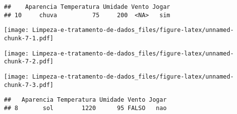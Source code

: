 \documentclass[
]{article}
\newenvironment{Shaded}{\begin{snugshade}}{\end{snugshade}}
\newcommand{\AttributeTok}[1]{\textcolor[rgb]{0.77,0.63,0.00}{#1}}
\newcommand{\CommentTok}[1]{\textcolor[rgb]{0.56,0.35,0.01}{\textit{#1}}}
\newcommand{\DecValTok}[1]{\textcolor[rgb]{0.00,0.00,0.81}{#1}}
\newcommand{\FunctionTok}[1]{\textcolor[rgb]{0.00,0.00,0.00}{#1}}
\newcommand{\NormalTok}[1]{#1}
\newcommand{\OtherTok}[1]{\textcolor[rgb]{0.56,0.35,0.01}{#1}}
\newcommand{\SpecialCharTok}[1]{\textcolor[rgb]{0.00,0.00,0.00}{#1}}
\begin{document}
\begin{verbatim}
##    Aparencia Temperatura Umidade Vento Jogar
## 10     chuva          75     200  <NA>   sim
\end{verbatim}

\begin{Shaded}
\end{Shaded}

\texttt{[image: Limpeza-e-tratamento-de-dados\_files/figure-latex/unnamed-chunk-7-1.pdf]}

\begin{Shaded}
\end{Shaded}

\texttt{[image: Limpeza-e-tratamento-de-dados\_files/figure-latex/unnamed-chunk-7-2.pdf]}

\begin{Shaded}
\end{Shaded}

\texttt{[image: Limpeza-e-tratamento-de-dados\_files/figure-latex/unnamed-chunk-7-3.pdf]}

\begin{Shaded}
\end{Shaded}

\begin{verbatim}
##   Aparencia Temperatura Umidade Vento Jogar
## 8       sol        1220      95 FALSO   nao
\end{verbatim}
\end{document}
